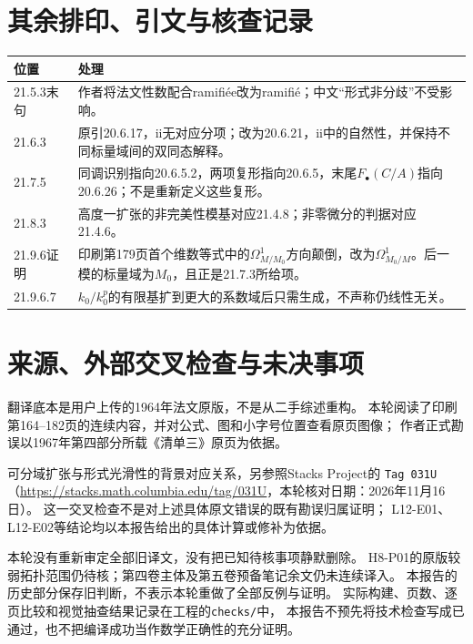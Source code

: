 \section*{其余排印、引文与核查记录}
\begin{longtable}{@{}p{.22\linewidth}p{.68\linewidth}@{}}
\toprule 位置&处理\\\midrule\endhead
21.5.3末句&作者将法文性数配合ramifiée改为ramifié；中文“形式非分歧”不受影响。\\
21.6.3&原引20.6.17，ii无对应分项；改为20.6.21，ii中的自然性，并保持不同标量域间的双同态解释。\\
21.7.5&同调识别指向20.6.5.2，两项复形指向20.6.5，末尾$F_\bullet(C/A)$指向20.6.26；不是重新定义这些复形。\\
21.8.3&高度一扩张的非完美性模基对应21.4.8；非零微分的判据对应21.4.6。\\
21.9.6证明&印刷第179页首个维数等式中的$\Omega^1_{M/M_0}$方向颠倒，改为$\Omega^1_{M_0/M}$。后一模的标量域为$M_0$，且正是21.7.3所给项。\\
21.9.6.7&$k_0/k_0^p$的有限基扩到更大的系数域后只需生成，不声称仍线性无关。\\
\bottomrule
\end{longtable}

\section*{来源、外部交叉检查与未决事项}
翻译底本是用户上传的1964年法文原版，不是从二手综述重构。
本轮阅读了印刷第164--182页的连续内容，并对公式、图和小字号位置查看原页图像；
作者正式勘误以1967年第四部分所载《清单三》原页为依据。

可分域扩张与形式光滑性的背景对应关系，另参照Stacks Project的
\texttt{Tag 031U}（\url{https://stacks.math.columbia.edu/tag/031U}，本轮核对日期：2026年11月16日）。
这一交叉检查不是对上述具体原文错误的既有勘误归属证明；
L12-E01、L12-E02等结论均以本报告给出的具体计算或修补为依据。

本轮没有重新审定全部旧译文，没有把已知待核事项静默删除。
H8-P01的原版较弱拓扑范围仍待核；第四卷主体及第五卷预备笔记余文仍未连续译入。
本报告的历史部分保存旧判断，不表示本轮重做了全部反例与证明。
实际构建、页数、逐页比较和视觉抽查结果记录在工程的\texttt{checks/}中，
本报告不预先将技术检查写成已通过，也不把编译成功当作数学正确性的充分证明。
